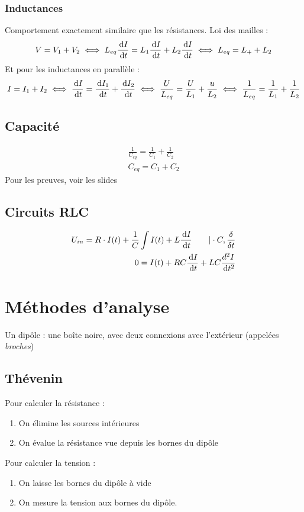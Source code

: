 \documentclass[12pt,a4paper]{article}
\begin{document}
\subsubsection{Inductances}
Comportement exactement similaire que les résistances. Loi des mailles :
\[V = V_1 + V_2 \iff L_{eq}\frac{\, \mathrm d I}{\, \mathrm d t} = L_1\frac{\, \mathrm d I}{\, \mathrm d t} + L_2 \frac{\, \mathrm d I}{\, \mathrm d t} \iff L_{eq} = L_+ + L_2\]
Et pour les inductances en parallèle :
\[I = I_1 + I_2 \iff \frac{\, \mathrm d I}{\, \mathrm d t} = \frac{\, \mathrm d I_1}{\, \mathrm d t} + \frac{\, \mathrm d I_2}{\, \mathrm d t} \iff \frac{U}{L_{eq}} = \frac{U}{L_1} + \frac{u}{L_2} \iff \frac{1}{L_{eq}} = \frac{1}{L_1} + \frac{1}{L_2}\]


\subsection{Capacité}
\begin{align}
	\frac{1}{C_{eq}} = \frac{1}{C_1} + \frac{1}{C_2} \tag{Condensateurs en Série}\\
	C_{eq} = C_1 + C_2 \tag{Condensateurs en Parallèle}
\end{align}
Pour les preuves, voir les slides

\subsection{Circuits RLC}
\begin{align*}
	U_{in} = R\cdot I(t) + \frac{1}{C}\int I(t) + L\frac{\, \mathrm d I}{\, \mathrm d t} \qquad |\cdot C, \frac{\delta}{\delta t}	\\
	0 = I(t) + RC\frac{\, \mathrm d I}{\, \mathrm d t} + LC \frac{d^2 I}{\, \mathrm d t^2}
\end{align*}

\section{Méthodes d'analyse}
\begin{boite}
	 Un dipôle : une boîte noire, avec deux connexions avec l'extérieur (appelées \textit{broches})
\end{boite}
\subsection{Thévenin}
Pour calculer la résistance : 
\begin{enumerate}
	\item 	On élimine les sources intérieures
	\item 	On évalue la résistance vue depuis les bornes du dipôle
\end{enumerate}
Pour calculer la tension :
\begin{enumerate}
	\item 	On laisse les bornes du dipôle à vide
	\item 	On mesure la tension aux bornes du dipôle.
\end{enumerate}
\end{document}
